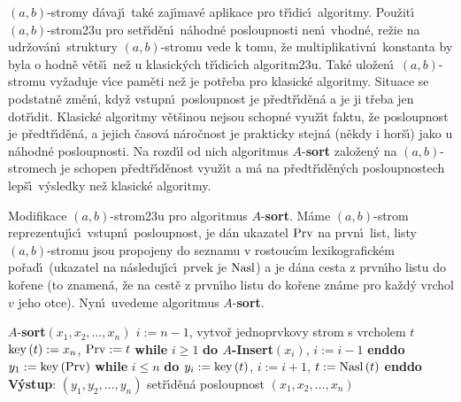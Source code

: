 \flushpar$\left(a,b\right)$-stromy d\'avaj\'\i\ tak\'e zaj\'\i mav\'e aplikace pro 
t\v r\'\i dic\'\i\ 
algoritmy. Pou\v zit\'\i\ $\left(a,b\right)$-strom\accent23u pro set\v r\'\i d\v en\'\i\ 
n\'ahodn\'e posloupnosti nen\'\i\ vhodn\'e, re\v zie na udr\v zov\'an\'\i\ 
struktury $\left(a,b\right)$-stromu vede k tomu, \v ze multiplikativn\'\i\ 
konstanta by byla o hodn\v e v\v et\v s\'\i\ ne\v z u klasick\'ych 
t\v r\'\i dic\'\i ch algoritm\accent23u. Tak\'e ulo\v zen\'\i\ $\left(
a,b\right)$-stromu 
vy\v zaduje v\'\i ce pam\v eti ne\v z je pot\v reba pro klasick\'e 
algoritmy. Situace se podstatn\v e zm\v en\'\i , kdy\v z vstupn\'\i\ 
posloupnost je p\v red\-t\v r\'\i\-d\v en\'a a je ji t\v reba jen dot\v r\'\i dit. 
Klasick\'e algoritmy v\v et\v sinou nejsou schopn\'e vyu\v z\'\i t faktu, \v ze 
posloupnost je p\v redt\v r\'\i d\v en\'a, a jejich \v casov\'a n\'aro\v cnost je 
prakticky stejn\'a (n\v ekdy i hor\v s\'\i ) jako u n\'ahodn\'e 
posloupnosti. Na rozd\'\i l od nich algoritmus $A$-{\bf sort }
zalo\v zen\'y na $\left(a,b\right)$-stromech je schopen p\v redt\v r\'\i d\v enost 
vyu\v z\'\i t a m\'a na p\v redt\v r\'\i d\v en\'ych posloupnostech lep\v s\'\i\ 
v\'ysledky ne\v z klasick\'e algoritmy.
\medskip

\flushpar Modifikace $\left(a,b\right)$-strom\accent23u pro algoritmus 
$A$-{\bf sort}. M\'ame $\left(a,b\right)$-strom reprezentuj\'\i c\'\i\ vstupn\'\i\ 
posloupnost, je d\'an ukazatel $\operatorname{Prv}$ na prvn\'\i\ list, listy 
$\left(a,b\right)$-stromu jsou propojeny do seznamu v rostouc\'\i m 
lexikografick\'em po\v rad\'\i\ (ukazatel na n\'asleduj\'\i c\'\i\ prvek je 
$\operatorname{Nasl}$) a je d\'ana cesta z prvn\'\i ho listu do ko\v rene (to 
znamen\'a, \v ze na cest\v e z prvn\'\i ho listu do ko\v rene zn\'ame 
pro ka\v zd\'y vrchol $v$ jeho otce). Nyn\'\i\ uvedeme algoritmus 
$A$-{\bf sort}. 
\bigskip

$A$-{\bf sort$\left(x_1,x_2,\dots,x_n\right)$\newline 
$i:=n-1$}, vytvo\v r jednoprvkovy strom s vrcholem $t$\newline 
$\operatorname{key}\left(t\right):=x_n$, $\operatorname{Prv}:=t$\newline 
{\bf while} $i\ge 1$ {\bf do $A$-Insert$\left(x_i\right)$}, $i:=i-1$ {\bf enddo}\newline 
$y_1:=\operatorname{key}\left(\operatorname{Prv}\right)$\newline 
{\bf while} $i\le n$ {\bf do\newline 
\phantom{---}$y_i:=\operatorname{key}\left(t\right)$}, $i:=i+1$, $t:=\operatorname{Nasl}\left(t\right)$\newline 
{\bf enddo\newline 
V\'ystup}: $\left(y_1,y_2,\dots,y_n\right)$ set\v r\'\i d\v en\'a posloupnost $
\left(x_1,x_2,\dots,x_n\right)$
\medskip

